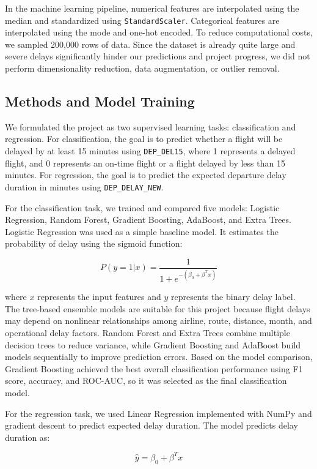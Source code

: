 In the machine learning pipeline, numerical features are interpolated using the median and standardized using \texttt{StandardScaler}. Categorical features are interpolated using the mode and one-hot encoded. To reduce computational costs, we sampled 200,000 rows of data. Since the dataset is already quite large and severe delays significantly hinder our predictions and project progress, we did not perform dimensionality reduction, data augmentation, or outlier removal.

\subsection{Methods and Model Training} 

We formulated the project as two supervised learning tasks: classification and regression. For classification, the goal is to predict whether a flight will be delayed by at least 15 minutes using \texttt{DEP\_DEL15}, where 1 represents a delayed flight, and 0 represents an on-time flight or a flight delayed by less than 15 minutes. For regression, the goal is to predict the expected departure delay duration in minutes using \texttt{DEP\_DELAY\_NEW}.

For the classification task, we trained and compared five models: Logistic Regression, Random Forest, Gradient Boosting, AdaBoost, and Extra Trees. Logistic Regression was used as a simple baseline model. It estimates the probability of delay using the sigmoid function:

\[
P(y=1|x)=\frac{1}{1+e^{-(\beta_0+\beta^Tx)}}
\]

where \(x\) represents the input features and \(y\) represents the binary delay label. The tree-based ensemble models are suitable for this project because flight delays may depend on nonlinear relationships among airline, route, distance, month, and operational delay factors. Random Forest and Extra Trees combine multiple decision trees to reduce variance, while Gradient Boosting and AdaBoost build models sequentially to improve prediction errors. Based on the model comparison, Gradient Boosting achieved the best overall classification performance using F1 score, accuracy, and ROC-AUC, so it was selected as the final classification model.

For the regression task, we used Linear Regression implemented with NumPy and gradient descent to predict expected delay duration. The model predicts delay duration as:

\[
\hat{y}=\beta_0+\beta^Tx
\]

